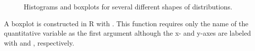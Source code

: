 \documentclass[10pt,openany]{book}\usepackage[]{graphicx}\usepackage[]{color}
\newenvironment{knitrout}{}{} %
\begin{document}
\begin{knitrout}
\begin{figure}[hbtp]
{}

\caption[Histograms and boxplots for several different shapes of distributions]{Histograms and boxplots for several different shapes of distributions.}\label{fig:BoxplotShape}
\end{figure}


\end{knitrout}


\vspace{-12pt}

A boxplot is constructed in R with .  This function requires only the name of the quantitative variable as the first argument although the x- and y-axes are labeled with  and , respectively.
\end{document}

